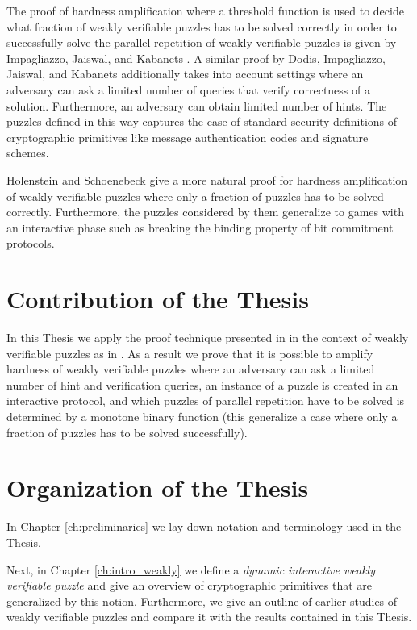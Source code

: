 \documentclass[11pt,a4paper,titlepage]{memoir}
\begin{document}
The proof of hardness amplification where a threshold function is used to decide what fraction of weakly verifiable puzzles has to be solved correctly
in order to successfully solve the parallel repetition of weakly verifiable puzzles is given by Impagliazzo, Jaiswal, and Kabanets \cite{impagliazzo2007chernoff}.
A similar proof by Dodis, Impagliazzo, Jaiswal, and Kabanets \cite{Dodis:2009:SAI:1530441.1530450} additionally
takes into account settings where an adversary can ask a limited number of queries that verify correctness of a solution.
Furthermore, an adversary can obtain limited number of hints. The puzzles defined in this way captures
the case of standard security definitions of cryptographic primitives like message authentication codes and signature schemes.

Holenstein and Schoenebeck \cite{DBLP:journals/corr/abs-1002-3534} give a more natural proof for hardness amplification
of weakly verifiable puzzles where only a fraction of puzzles has to be solved correctly.
Furthermore, the puzzles considered by them generalize to games with an interactive phase
such as breaking the binding property of bit commitment protocols.

\section{Contribution of the Thesis}
In this Thesis we apply the proof technique presented in \cite{DBLP:journals/corr/abs-1002-3534}
in the context of weakly verifiable puzzles as in \cite{Dodis:2009:SAI:1530441.1530450}.
As a result we prove that it is possible to amplify hardness of weakly verifiable puzzles where an adversary
can ask a limited number of hint and verification queries, an instance of a puzzle is created in an interactive protocol,
and which puzzles of parallel repetition have to be solved is determined by a monotone binary function (this generalize
a case where only a fraction of puzzles has to be solved successfully).

\section{Organization of the Thesis}
In Chapter \ref{ch:preliminaries} we lay down notation and terminology used in the Thesis.

Next, in Chapter \ref{ch:intro_weakly} we define a \textit{dynamic interactive weakly verifiable puzzle} and
give an overview of cryptographic primitives that are generalized by this notion.
Furthermore, we give an outline of earlier studies of weakly verifiable puzzles and compare
it with the results contained in this Thesis.
\end{document}
